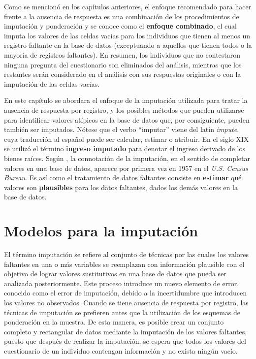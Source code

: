 \documentclass[
  12pt,
  spanish,
]{book}
\begin{document}
Como se mencionó en los capítulos anteriores, el enfoque recomendado para hacer frente a la ausencia de respuesta es una combinación de los procedimientos de imputación y ponderación y se conoce como el \textbf{enfoque combinado}, el cual imputa los valores de las celdas vacías para los individuos que tienen al menos un registro faltante en la base de datos (exceptuando a aquellos que tienen todos o la mayoría de registros faltantes). En resumen, los individuos que no contestaron ninguna pregunta del cuestionario son eliminados del análisis, mientras que los restantes serán considerado en el análisis con sus respuestas originales o con la imputación de las celdas vacías.

En este capítulo se abordara el enfoque de la imputación utilizada para tratar la ausencia de respuesta por registro, y los posibles métodos que pueden utilizarse para identificar valores atípicos en la base de datos que, por consiguiente, pueden también ser imputados. Nótese que el verbo ``imputar'' viene del latín \emph{impute}, cuya traducción al español puede ser calcular, estimar o atribuir. En el siglo XIX se utilizó el término \textbf{ingreso imputado} para denotar el ingreso derivado de los bienes raíces. Según \citet{VanBuuren}, la connotación de la imputación, en el sentido de completar valores en una base de datos, aparece por primera vez en 1957 en el \emph{U.S. Census Bureau}. Es así como el tratamiento de datos faltantes consiste en \textbf{estimar} qué valores son \textbf{plausibles} para los datos faltantes, dados los demás valores en la base de datos.

\hypertarget{modelos-para-la-imputaciuxf3n}{%
\section{Modelos para la imputación}\label{modelos-para-la-imputaciuxf3n}}

El término imputación se refiere al conjunto de técnicas por las cuales los valores faltantes en una o más variables se reemplazan con información plausible con el objetivo de lograr valores sustitutivos en una base de datos que pueda ser analizada posteriormente. Este proceso introduce un nuevo elemento de error, conocido como el error de imputación, debido a la incertidumbre que introducen los valores no observados. Cuando se tiene ausencia de respuesta por registro, las técnicas de imputación se prefieren antes que la utilización de los esquemas de ponderación en la muestra. De esta manera, es posible crear un conjunto completo y rectangular de datos mediante la imputación de los valores faltantes, puesto que después de realizar la imputación, se espera que todos los valores del cuestionario de un individuo contengan información y no exista ningún vacío.
\end{document}
